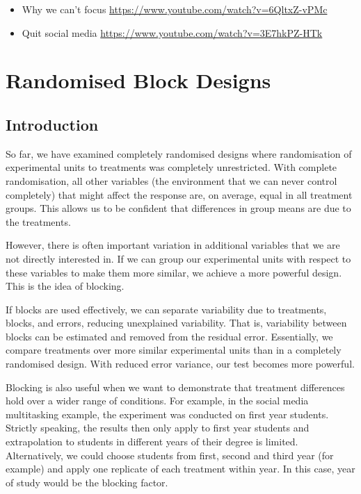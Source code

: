 \documentclass[
  letterpaper,
]{book}
\begin{document}
\begin{itemize}
\item
  Why we can't focus \url{https://www.youtube.com/watch?v=6QltxZ-vPMc}
\item
  Quit social media \url{https://www.youtube.com/watch?v=3E7hkPZ-HTk}
\end{itemize}

\part{Randomised Block Designs}

\chapter{Introduction}\label{introduction-1}

So far, we have examined completely randomised designs where
randomisation of experimental units to treatments was completely
unrestricted. With complete randomisation, all other variables (the
environment that we can never control completely) that might affect the
response are, on average, equal in all treatment groups. This allows us
to be confident that differences in group means are due to the
treatments.

However, there is often important variation in additional variables that
we are not directly interested in. If we can group our experimental
units with respect to these variables to make them more similar, we
achieve a more powerful design. This is the idea of blocking.

If blocks are used effectively, we can separate variability due to
treatments, blocks, and errors, reducing unexplained variability. That
is, variability between blocks can be estimated and removed from the
residual error. Essentially, we compare treatments over more similar
experimental units than in a completely randomised design. With reduced
error variance, our test becomes more powerful.

Blocking is also useful when we want to demonstrate that treatment
differences hold over a wider range of conditions. For example, in the
social media multitasking example, the experiment was conducted on first
year students. Strictly speaking, the results then only apply to first
year students and extrapolation to students in different years of their
degree is limited. Alternatively, we could choose students from first,
second and third year (for example) and apply one replicate of each
treatment within year. In this case, year of study would be the blocking
factor.
\end{document}
